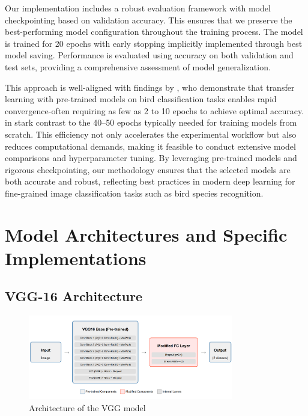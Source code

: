 \documentclass[a4paper,12pt]{report}
\begin{document}
Our implementation includes a robust evaluation framework with model checkpointing based on validation accuracy. This ensures that we preserve the best-performing model configuration throughout the training process. The model is trained for 20 epochs with early stopping implicitly implemented through best model saving. Performance is evaluated using accuracy on both validation and test sets, providing a comprehensive assessment of model generalization.

This approach is well-aligned with findings by \citep{tan2018survey}, who demonstrate that transfer learning with pre-trained models on bird classification tasks enables rapid convergence-often requiring as few as 2 to 10 epochs to achieve optimal accuracy. in stark contrast to the 40–50 epochs typically needed for training models from scratch. This efficiency not only accelerates the experimental workflow but also reduces computational demands, making it feasible to conduct extensive model comparisons and hyperparameter tuning. By leveraging pre-trained models and rigorous checkpointing, our methodology ensures that the selected models are both accurate and robust, reflecting best practices in modern deep learning for fine-grained image classification tasks such as bird species recognition.

\section{Model Architectures and Specific Implementations}

\subsection{VGG-16 Architecture}

\begin{figure}[H]
    \centering
    \includegraphics[width=0.8\textwidth]{images/architecture/vgg.png}
    \caption{Architecture of the VGG model}
    \label{fig:vgg_architecture}
\end{figure}
\end{document}
